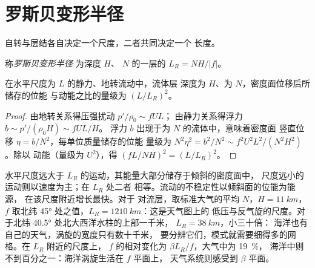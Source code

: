 \section{罗斯贝变形半径}\label{sec:b3:gfd-foundations:rossby-radius}

自转与层结各自决定一个尺度，二者共同决定一个
长度。

\begin{definition}[罗斯贝变形半径]\label{def:b3:gfd-foundations:rossby-radius}
称\emph{罗斯贝变形半径}
为深度 $H$、 $N$ 的一层的 $L_R = NH/|f|$。
\end{definition}

\begin{proposition}[平衡流的位能与动能]\label{prop:b3:gfd-foundations:rossby-radius}
在水平尺度为 $L$ 的静力、地转流动中，流体层
深度为 $H$、为 $N$，密度面位移后所储存的位能
与动能之比的量级为
$(L/L_R)^2$。
\end{proposition}

\begin{proof}
由地转关系得压强扰动 $p'/\rho_0 \sim fUL$；
由静力关系得浮力 $b \sim p'/(\rho_0H) \sim fUL/H$。
浮力 $b$ 出现于为 $N$ 的流体中，意味着密度面
竖直位移 $\eta = b/N^2$，每单位质量储存的位能
量级为 $N^2\eta^2 = b^2/N^2 \sim f^2U^2L^2/(N^2H^2)$。除以
动能（量级为 $U^2$），得 $(fL/NH)^2 = (L/L_R)^2$。
\end{proof}

水平尺度远大于 $L_R$ 的运动，其能量大部分储存于倾斜的密度面中，
尺度远小的运动则以速度为主；在 $L_R$ 处二者
相等。流动的不稳定性以倾斜面的位能为能源，
在该尺度附近增长最快。对于
对流层，取标准大气的平均 $N$，$H =
\qty{11}{km}$，$f$ 取北纬 \ang{45} 处之值，$L_R = \qty{1210}{km}$：这是天气图上的
低压与反气旋的尺度。对于北纬 \ang{40.5} 处北大西洋水柱的上部一千米，
$L_R = \qty{38}{km}$，小三十倍：
海洋也有自己的天气，涡旋的宽度只有数十千米，
要分辨它们，模式就需要细得多的网格。在 $L_R$ 附近的尺度上，
$f$ 的相对变化为 $\beta L_R/f$，大气中为 \qty{19}{\percent}，
海洋中则不到百分之一：海洋涡旋生活在 $f$ 平面上，
天气系统则感受到 $\beta$ 平面。

